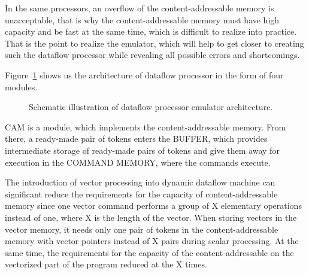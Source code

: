 \documentclass[
11pt,%
tightenlines,%
twoside,%
onecolumn,%
nofloats,%
nobibnotes,%
nofootinbib,%
superscriptaddress,%
noshowpacs,%
centertags]%
{revtex4}
\begin{document}
In the same processors, an overflow of the content-addressable memory is unacceptable, that is why the content-addressable memory must have high capacity and be fast at the same time, which is difficult to realize into practice. That is the point to realize the emulator, which will help to get closer to creating such the dataflow processor while revealing all possible errors and shortcomings.


Figure~\ref{fig:dataflow_emulator} shows us the architecture of dataflow processor in the form of four modules.

\begin{figure}[h!]
\setcaptionmargin{5mm}
\onelinecaptionsfalse
{}
\caption{Schematic illustration of dataflow processor emulator architecture.}
\label{fig:dataflow_emulator}
\end{figure}

CAM is a module, which implements the content-addressable memory. From there, a ready-made pair of tokens enters the BUFFER, which provides intermediate storage of ready-made pairs of tokens and give them away for execution in the COMMAND MEMORY, where the commands execute.

The introduction of vector processing into dynamic dataflow machine can significant reduce the requirements for the capacity of content-addressable memory since one vector command performs a group of X elementary operations instead of one, where X is the length of the vector. When storing vectors in the vector memory, it needs only one pair of tokens in the content-addressable memory with vector pointers instead of X pairs during scalar processing. At the same time, the requirements for the capacity of the content-addressable on the vectorized part of the program reduced at the X times.
\end{document}
